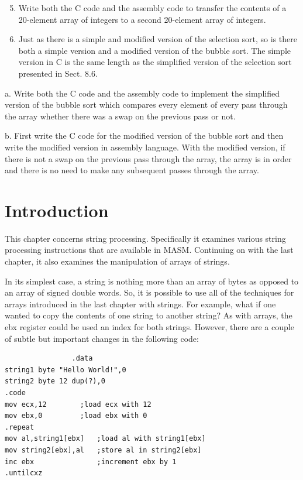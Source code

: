 \documentclass[10pt]{book}
\begin{document}
\begin{enumerate}
  \setcounter{enumi}{4}
  \item Write both the C code and the assembly code to transfer the contents of a 20-element array of integers to a second 20-element array of integers.
  \item Just as there is a simple and modified version of the selection sort, so is there both a simple version and a modified version of the bubble sort. The simple version in C is the same length as the simplified version of the selection sort presented in Sect. 8.6.
\end{enumerate}
a. Write both the C code and the assembly code to implement the simplified version of the bubble sort which compares every element of every pass through the array whether there was a swap on the previous pass or not.

b. First write the C code for the modified version of the bubble sort and then write the modified version in assembly language. With the modified version, if there is not a swap on the previous pass through the array, the array is in order and there is no need to make any subsequent passes through the array.

\section{Introduction}
This chapter concerns string processing. Specifically it examines various string processing instructions that are available in MASM. Continuing on with the last chapter, it also examines the manipulation of arrays of strings.

In its simplest case, a string is nothing more than an array of bytes as opposed to an array of signed double words. So, it is possible to use all of the techniques for arrays introduced in the last chapter with strings. For example, what if one wanted to copy the contents of one string to another string? As with arrays, the ebx register could be used an index for both strings. However, there are a couple of subtle but important changes in the following code:

\begin{verbatim}
                .data
string1 byte "Hello World!",0
string2 byte 12 dup(?),0
.code
mov ecx,12        ;load ecx with 12
mov ebx,0         ;load ebx with 0
.repeat
mov al,string1[ebx]   ;load al with string1[ebx]
mov string2[ebx],al   ;store al in string2[ebx]
inc ebx               ;increment ebx by 1
.untilcxz
\end{verbatim}
\end{document}
